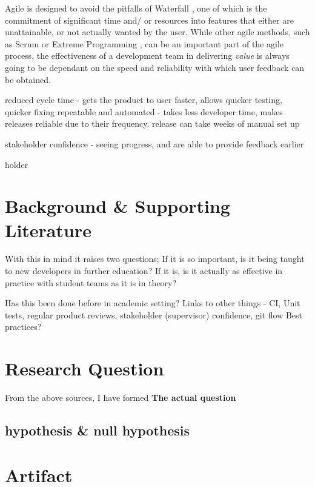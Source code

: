 \documentclass[lettersize,journal]{IEEEtran}
\begin{document}
        Agile is designed to avoid the pitfalls of Waterfall \cite{royce1987managing}, one of which is the commitment of significant time and/ or resources into features that either are unattainable, or not actually wanted by the user. While other agile methods, such as Scrum or Extreme Programming \cite{cohen2004introduction,agilewithscrum}, can be an important part of the agile process, the effectiveness of a development team in delivering \textit{value} is always going to be dependant on the speed and reliability with which user feedback can be obtained. 

        reduced cycle time - gets the product to user faster, allows quicker testing, quicker fixing
        repeatable and automated - takes less developer time, makes releases reliable due to their frequency. release can take weeks of manual set up \cite{paddy,ContDelIntro}

        stakeholder confidence - seeing progress, and are able to provide feedback earlier


        holder\cite{ContDelIntro,paddy}
    
\section{Background \& Supporting Literature}
    With this in mind it raises two questions; If it is so important, is it being taught to new developers in further education? If it is, is it actually as effective in practice with student teams as it is in theory?

    Has this been done before in academic setting\cite{CDCourse2014,CDMobileDev,Tornado,IndustryAcademyDenmark}? 
    Links to other things - CI\cite{CICDCD}, Unit tests, regular product reviews, stakeholder (supervisor) confidence, git flow \cite{gitBranching}
    Best practices\cite{duvall2007continuous}? 

\section{Research Question}
    From the above sources, I have formed \textbf{The actual question}
    \subsection{hypothesis \& null hypothesis}

\section{Artifact}
\end{document}
